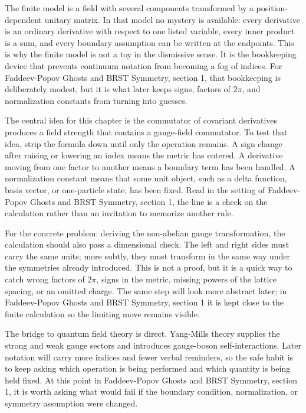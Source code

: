The finite model is a field with several components transformed by a position-dependent unitary matrix.  In that model no mystery is available: every derivative is an ordinary derivative with respect to one listed variable, every inner product is a sum, and every boundary assumption can be written at the endpoints.  This is why the finite model is not a toy in the dismissive sense.  It is the bookkeeping device that prevents continuum notation from becoming a fog of indices.  For Faddeev-Popov Ghosts and BRST Symmetry, section 1, that bookkeeping is deliberately modest, but it is what later keeps signs, factors of \(2\pi\), and normalization constants from turning into guesses.

The central idea for this chapter is the commutator of covariant derivatives produces a field strength that contains a gauge-field commutator.  To test that idea, strip the formula down until only the operation remains.  A sign change after raising or lowering an index means the metric has entered.  A derivative moving from one factor to another means a boundary term has been handled.  A normalization constant means that some unit object, such as a delta function, basis vector, or one-particle state, has been fixed.  Read in the setting of Faddeev-Popov Ghosts and BRST Symmetry, section 1, the line is a check on the calculation rather than an invitation to memorize another rule.

For the concrete problem: deriving the non-abelian gauge transformation, the calculation should also pass a dimensional check.  The left and right sides must carry the same units; more subtly, they must transform in the same way under the symmetries already introduced.  This is not a proof, but it is a quick way to catch wrong factors of \(2\pi\), signs in the metric, missing powers of the lattice spacing, or an omitted charge.  The same step will look more abstract later; in Faddeev-Popov Ghosts and BRST Symmetry, section 1 it is kept close to the finite calculation so the limiting move remains visible.

The bridge to quantum field theory is direct.  Yang-Mills theory supplies the strong and weak gauge sectors and introduces gauge-boson self-interactions.  Later notation will carry more indices and fewer verbal reminders, so the safe habit is to keep asking which operation is being performed and which quantity is being held fixed.  At this point in Faddeev-Popov Ghosts and BRST Symmetry, section 1, it is worth asking what would fail if the boundary condition, normalization, or symmetry assumption were changed.

